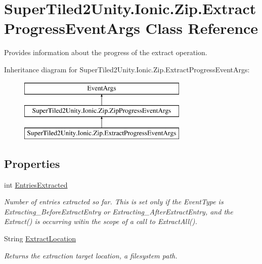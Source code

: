 \hypertarget{class_super_tiled2_unity_1_1_ionic_1_1_zip_1_1_extract_progress_event_args}{}\section{Super\+Tiled2\+Unity.\+Ionic.\+Zip.\+Extract\+Progress\+Event\+Args Class Reference}
\label{class_super_tiled2_unity_1_1_ionic_1_1_zip_1_1_extract_progress_event_args}


Provides information about the progress of the extract operation.  


Inheritance diagram for Super\+Tiled2\+Unity.\+Ionic.\+Zip.\+Extract\+Progress\+Event\+Args\+:\begin{figure}[H]
\begin{center}
\leavevmode
\includegraphics[height=3.000000cm]{class_super_tiled2_unity_1_1_ionic_1_1_zip_1_1_extract_progress_event_args}
\end{center}
\end{figure}
\subsection*{Properties}
\begin{DoxyCompactItemize}
\item 
int \mbox{\hyperlink{class_super_tiled2_unity_1_1_ionic_1_1_zip_1_1_extract_progress_event_args_a347e714f5fbacc763c5357b1dbf49169}{Entries\+Extracted}}
\begin{DoxyCompactList}\small\item\em Number of entries extracted so far. This is set only if the Event\+Type is Extracting\+\_\+\+Before\+Extract\+Entry or Extracting\+\_\+\+After\+Extract\+Entry, and the Extract() is occurring witin the scope of a call to Extract\+All(). \end{DoxyCompactList}\item 
String \mbox{\hyperlink{class_super_tiled2_unity_1_1_ionic_1_1_zip_1_1_extract_progress_event_args_a0202e78e09c6e75adc848cd4c24c59ae}{Extract\+Location}}
\begin{DoxyCompactList}\small\item\em Returns the extraction target location, a filesystem path. \end{DoxyCompactList}\end{DoxyCompactItemize}


